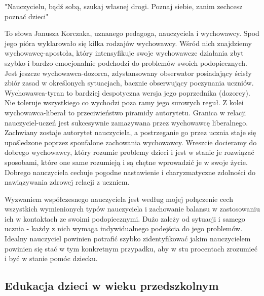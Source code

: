 \documentclass{article}
\begin{document}
	"Nauczycielu, bądź sobą,
	szukaj własnej drogi.
	Poznaj siebie, zanim zechcesz
	poznać dzieci"
	\par
	To słowa\cite{ref2} Janusza Korczaka, uznanego pedagoga, nauczyciela i wychowawcy. Spod jego pióra wyklarowało się kilka rodzajów wychowawcy. Wśród nich znajdziemy wychowawcę-apostoła, który intensyfikuje swoje wychowawcze działania zbyt szybko i bardzo emocjonalnie podchodzi do problemów swoich podopiecznych. Jest jeszcze wychowawca-dozorca, zdystansowany obserwator posiadający ścisły zbiór zasad w określonych sytuacjach, bacznie obserwujący poczynania uczniów. Wychowawca-tyran to bardziej despotyczna wersja jego poprzednika (dozorcy). Nie toleruje wszystkiego co wychodzi poza ramy jego surowych reguł. Z kolei wychowawca-liberał to przeciwieństwo piramidy autorytetu. Granica w relacji nauczyciel-uczeń jest sukcesywnie zamazywana przez wychowawcę liberalnego. Zachwiany zostaje autorytet nauczyciela, a postrzeganie go przez ucznia staje się upośledzone poprzez spoufalone zachowania wychowawcy. Wreszcie docieramy do dobrego wychowawcy, który rozumie problemy dzieci i jest w stanie je rozwiązać sposobami, które one same rozumieją i są chętne wprowadzić je w swoje życie. Dobrego nauczyciela cechuje pogodne nastawienie i charyzmatyczne zdolności do nawiązywania zdrowej relacji z uczniem.
	\par
	Wyzwaniem współczesnego nauczyciela jest według mojej połączenie cech wszystkich wymienionych typów nauczyciela i zachowanie balansu w zastosowaniu ich w kontaktach ze swoimi podopiecznymi. Dużo zależy od sytuacji i samego ucznia - każdy z nich wymaga indywidualnego podejścia do jego problemów. Idealny nauczyciel powinien potrafić szybko zidentyfikować jakim nauczycielem powinien się stać w tym konkretnym przypadku, aby w stu procentach zrozumieć i być w stanie pomóc dziecku.
	
	\subsection{Edukacja dzieci w wieku przedszkolnym}
	
\end{document}
